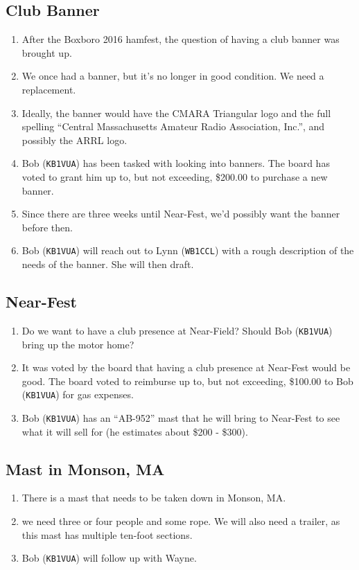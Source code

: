 \documentclass[10pt,letterpaper]{article}
\begin{document}
\subsection{Club Banner}
\begin{enumerate}
  \item After the Boxboro 2016 hamfest, the question of having a club banner was brought up.
  \item We once had a banner, but it's no longer in good condition. We need a replacement.
  \item Ideally, the banner would have the CMARA Triangular logo and the full spelling ``Central Massachusetts Amateur Radio Association, Inc.'', and possibly the ARRL logo.
  \item Bob (\texttt{KB1VUA}) has been tasked with looking into banners. The board has voted to grant him up to, but not exceeding, \$200.00 to purchase a new banner.
  \item Since there are three weeks until Near-Fest, we'd possibly want the banner before then.
  \item Bob (\texttt{KB1VUA}) will reach out to Lynn (\texttt{WB1CCL}) with a rough description of the needs of the banner. She will then draft.
\end{enumerate}

\subsection{Near-Fest}
\begin{enumerate}
  \item Do we want to have a club presence at Near-Field? Should Bob (\texttt{KB1VUA}) bring up the motor home?
  \item It was voted by the board that having a club presence at Near-Fest would be good. The board voted to reimburse up to, but not exceeding, \$100.00 to Bob (\texttt{KB1VUA}) for gas expenses.
  \item Bob (\texttt{KB1VUA}) has an ``AB-952'' mast that he will bring to Near-Fest to see what it will sell for (he estimates about \$200 - \$300).
\end{enumerate}

\subsection{Mast in Monson, MA}
\begin{enumerate}
  \item There is a mast that needs to be taken down in Monson, MA.
  \item we need three or four people and some rope. We will also need a trailer, as this mast has multiple ten-foot sections.
  \item Bob (\texttt{KB1VUA}) will follow up with Wayne.
\end{enumerate}
\end{document}
